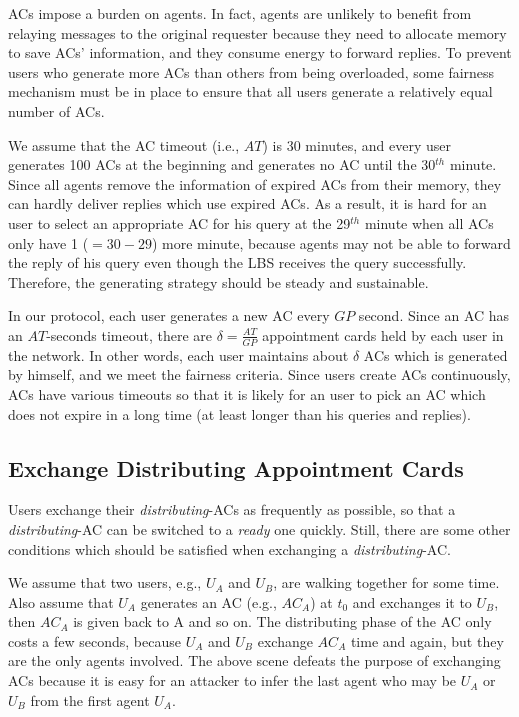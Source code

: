 ACs impose a burden on agents. In fact, agents are unlikely to benefit from relaying messages to the original requester because they need to allocate memory to save ACs' information, and they consume energy to forward replies. To prevent users who generate more ACs than others from being overloaded, some fairness mechanism must be in place to ensure that all users generate a relatively equal number of ACs.

We assume that the AC timeout (i.e., $AT$) is 30 minutes, and every user generates 100 ACs at the beginning and generates no AC until the 30${}^{th}$ minute. Since all agents remove the information of expired ACs from their memory, they can hardly deliver replies which use expired ACs. As a result, it is hard for an user to select an appropriate AC for his query at the 29${}^{th}$ minute when all ACs only have 1 ($=30-29$) more minute, because agents may not be able to forward the reply of his query even though the LBS receives the query successfully. Therefore, the generating strategy should be steady and sustainable.

In our protocol, each user generates a new AC every $GP$ second. Since an AC has an $AT$-seconds timeout, there are $\delta =\frac{AT}{GP}$ appointment cards held by each user in the network. In other words, each user maintains about $\delta$ ACs which is generated by himself, and we meet the fairness criteria. Since users create ACs continuously, ACs have various timeouts so that it is likely for an user to pick an AC which does not expire in a long time (at least longer than his queries and replies).


\subsection{ Exchange Distributing Appointment Cards}\label{subsec_ExchangeDisAptCrd}

\noindent Users exchange their \textit{distributing}-ACs as frequently as possible, so that a \textit{distributing}-AC can be switched to a \textit{ready} one quickly. Still, there are some other conditions which should be satisfied when exchanging a \textit{distributing}-AC.

We assume that two users, e.g., $U_A$ and $U_B$, are walking together for some time. Also assume that $U_A$ generates an AC (e.g., ${AC}_A$) at $t_0$ and exchanges it to $U_B$, then ${AC}_A$ is given back to A and so on. The distributing phase of the AC only costs a few seconds, because $U_A$ and $U_B$ exchange ${AC}_A$ time and again, but they are the only agents involved. The above scene defeats the purpose of exchanging ACs because it is easy for an attacker to infer the last agent who may be $U_A$ or $U_B$ from the first agent $U_A$. 

